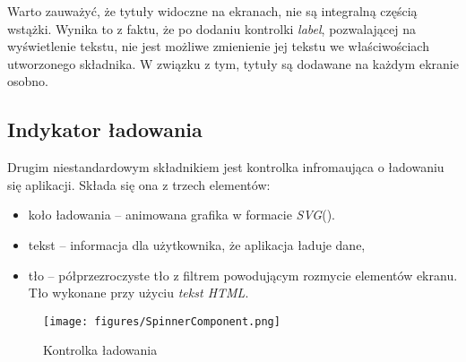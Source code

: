 Warto zauważyć, że tytuły widoczne na ekranach, nie są integralną częścią wstążki. Wynika to z faktu, że po dodaniu kontrolki \emph{label}, pozwalającej na wyświetlenie tekstu, nie jest możliwe zmienienie jej  tekstu we właściwościach utworzonego składnika. W związku z tym, tytuły są dodawane na każdym ekranie osobno.


\subsection{Indykator ładowania}
Drugim niestandardowym składnikiem jest kontrolka infromaująca o ładowaniu się aplikacji. Składa się ona z trzech elementów:
\begin{itemize}
    \item koło ładowania -- animowana grafika w formacie \emph{SVG}().
    \item tekst -- informacja dla użytkownika, że aplikacja ładuje dane,
    \item tło -- półprzezroczyste tło z filtrem powodującym rozmycie elementów ekranu. Tło wykonane przy użyciu \emph{tekst HTML}.
\end{itemize}

\begin{figure}[H]
    \centering
    \texttt{[image: figures/SpinnerComponent.png]}
    \caption{Kontrolka ładowania}
    \label{fig:spinnercomponent}
\end{figure}

